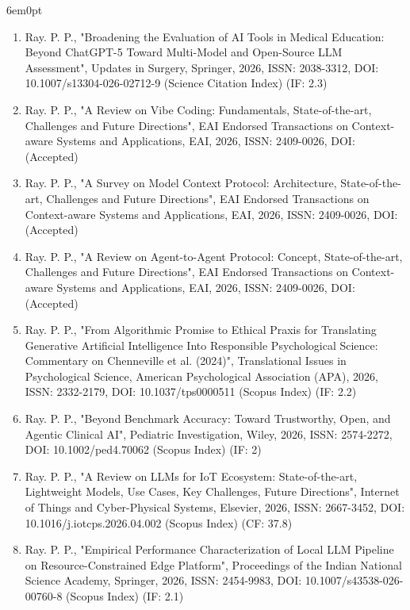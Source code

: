 \documentclass[11pt,a4paper]{moderncv}
\begin{document}
\begin{adjustwidth}{6em}{0pt}
\begin{enumerate}
		\item Ray. P. P., "Broadening the Evaluation of AI Tools in Medical Education: Beyond ChatGPT-5 Toward Multi-Model and Open-Source LLM Assessment", Updates in Surgery, Springer, 2026, ISSN: 2038-3312, DOI: 10.1007/s13304-026-02712-9  (Science Citation Index) (IF: 2.3) 
		
		
		\item Ray. P. P., "A Review on Vibe Coding: Fundamentals, State-of-the-art, Challenges and Future Directions", EAI Endorsed Transactions on Context-aware Systems and Applications, EAI, 2026, ISSN: 2409-0026, DOI:   (Accepted)

		\item Ray. P. P., "A Survey on Model Context Protocol: Architecture, State-of-the-art, Challenges and Future Directions", EAI Endorsed Transactions on Context-aware Systems and Applications, EAI, 2026, ISSN: 2409-0026, DOI:   (Accepted)
		
		\item Ray. P. P., "A Review on Agent-to-Agent Protocol: Concept, State-of-the-art, Challenges and Future Directions", EAI Endorsed Transactions on Context-aware Systems and Applications, EAI, 2026, ISSN: 2409-0026, DOI:   (Accepted)
		
		\item Ray. P. P., "From Algorithmic Promise to Ethical Praxis for Translating Generative Artificial Intelligence Into Responsible Psychological Science: Commentary on Chenneville et al. (2024)", Translational Issues in Psychological Science, American Psychological Association (APA), 2026, ISSN: 2332-2179, DOI: 10.1037/tps0000511 (Scopus Index) (IF: 2.2)
		
		\item Ray. P. P., "Beyond Benchmark Accuracy: Toward Trustworthy, Open, and Agentic Clinical AI", Pediatric Investigation, Wiley, 2026, ISSN: 2574-2272, DOI: 10.1002/ped4.70062 (Scopus Index) (IF: 2)
		
		\item Ray. P. P., "A Review on LLMs for IoT Ecosystem: State-of-the-art, Lightweight Models, Use Cases, Key Challenges, Future Directions", Internet of Things and Cyber-Physical Systems, Elsevier, 2026, ISSN: 2667-3452, DOI: 10.1016/j.iotcps.2026.04.002 (Scopus Index) (CF: 37.8)

		\item Ray. P. P., "Empirical Performance Characterization of Local LLM Pipeline on Resource-Constrained Edge Platform", Proceedings of the Indian National Science Academy, Springer, 2026, ISSN: 2454-9983, DOI: 10.1007/s43538-026-00760-8 (Scopus Index) (IF: 2.1)
		

\end{enumerate}
\end{adjustwidth}
\end{document}
